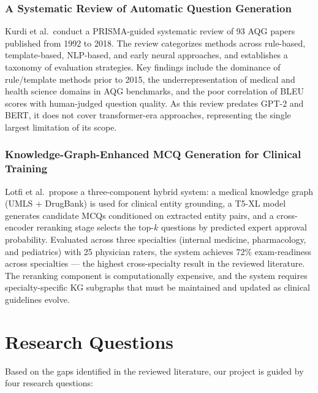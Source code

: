 \documentclass[conference]{IEEEtran}
\begin{document}
\subsubsection{A Systematic Review of Automatic Question Generation~\cite{kurdi2020systematic}}
Kurdi et al.\ conduct a PRISMA-guided systematic review of 93 AQG papers published from 1992 to 2018. The review categorizes methods across rule-based, template-based, NLP-based, and early neural approaches, and establishes a taxonomy of evaluation strategies. Key findings include the dominance of rule/template methods prior to 2015, the underrepresentation of medical and health science domains in AQG benchmarks, and the poor correlation of BLEU scores with human-judged question quality. As this review predates GPT-2 and BERT, it does not cover transformer-era approaches, representing the single largest limitation of its scope.

\subsubsection{Knowledge-Graph-Enhanced MCQ Generation for Clinical Training~\cite{lotfi2024kg}}
Lotfi et al.\ propose a three-component hybrid system: a medical knowledge graph (UMLS + DrugBank) is used for clinical entity grounding, a T5-XL model generates candidate MCQs conditioned on extracted entity pairs, and a cross-encoder reranking stage selects the top-$k$ questions by predicted expert approval probability. Evaluated across three specialties (internal medicine, pharmacology, and pediatrics) with 25 physician raters, the system achieves 72\% exam-readiness across specialties --- the highest cross-specialty result in the reviewed literature. The reranking component is computationally expensive, and the system requires specialty-specific KG subgraphs that must be maintained and updated as clinical guidelines evolve.

\section{Research Questions}

Based on the gaps identified in the reviewed literature, our project is guided by four research questions:
\end{document}
